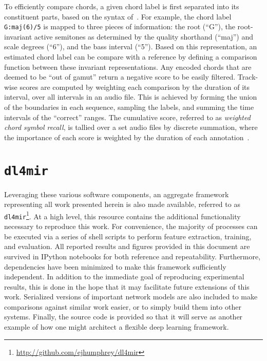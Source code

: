 To efficiently compare chords, a given chord label is first separated into its
constituent parts, based on the syntax of~\cite{harte2010towards}.
For example, the chord label \texttt{G:maj(6)/5} is mapped to three pieces of information: the root (``G''), the root-invariant active semitones as determined by the quality shorthand (``maj'') and scale degrees (``6''), and the bass interval (``5'').
Based on this representation, an estimated chord label can be compare with a reference by defining a comparison function between these invariant representations.
Any encoded chords that are deemed to be ``out of gamut'' return a negative score to be easily filtered.
Track-wise scores are computed by weighting each comparison by the duration of its interval, over all intervals in an audio file.
This is achieved by forming the union of the boundaries in each sequence, sampling the labels, and summing the time intervals of the ``correct'' ranges.
The cumulative score, referred to as \emph{weighted chord symbol recall}, is tallied over a set audio files by discrete summation, where the importance of each score is weighted by the duration of each annotation~\cite{cho2013mirex}.


\section{\texttt{dl4mir}}
\label{sec:dl4mir}

Leveraging these various software components, an aggregate framework representing all work presented herein is also made available, referred to as \texttt{dl4mir}\footnote{\url{http://github.com/ejhumphrey/dl4mir}}.
At a high level, this resource contains the additional functionality necessary to reproduce this work.
For convenience, the majority of processes can be executed via a series of shell scripts to perform feature extraction, training, and evaluation.
All reported results and figures provided in this document are survived in IPython notebooks for both reference and repeatability.
Furthermore, dependencies have been minimized to make this framework sufficiently independent.
In addition to the immediate goal of reproducing experimental results, this is done in the hope that it may facilitate future extensions of this work.
Serialized versions of important network models are also included to make comparisons against similar work easier, or to simply build them into other systems.
Finally, the source code is provided so that it will serve as another example of how one might architect a flexible deep learning framework.


